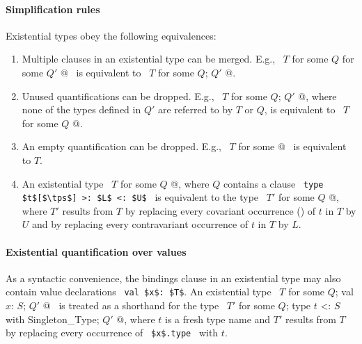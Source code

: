 \paragraph{Simplification rules}
Existential types obey the following equivalences:
\begin{enumerate}
\item
Multiple  clauses in an existential type can be merged. E.g., ~\lstinline@$T$ for some { $Q$ } for some { $Q'$ }@~ is equivalent to ~\lstinline@$T$ for some { $Q$; $Q'$ }@. 

\item
Unused quantifications can be dropped. E.g., ~\lstinline@$T$ for some { $Q$; $Q'$ }@, where none of the types defined in $Q'$ are referred to by $T$ or $Q$, is equivalent to ~\lstinline@$T$ for some { $Q$ }@. 

\item
An empty quantification can be dropped. E.g., ~\lstinline@$T$ for some { }@~ is equivalent to $T$. 

\item
An existential type ~\lstinline@$T$ for some { $Q$ }@, where $Q$ contains a clause ~\lstinline!type $t$[$\tps$] >: $L$ <: $U$!~ is equivalent to the type ~\lstinline@$T'$ for some { $Q$ }@, where $T'$ results from $T$ by replacing every covariant occurrence () of $t$ in $T$ by $U$ and by replacing every contravariant occurrence of $t$ in $T$ by $L$. 
\end{enumerate}



\paragraph{Existential quantification over values}
As a syntactic convenience, the bindings clause in an existential type may also contain value declarations ~\lstinline!val $x$: $T$!. An existential type ~\lstinline@$T$ for some { $Q$; val $x$: $S$; $Q'$ }@~ is treated as a shorthand for the type ~\lstinline@$T'$ for some { $Q$; type $t$ <: $S$ with Singleton_Type; $Q'$ }@, where $t$ is a fresh type name and $T'$ results from $T$ by replacing every occurrence of ~\lstinline!$x$.type!~ with $t$. 



